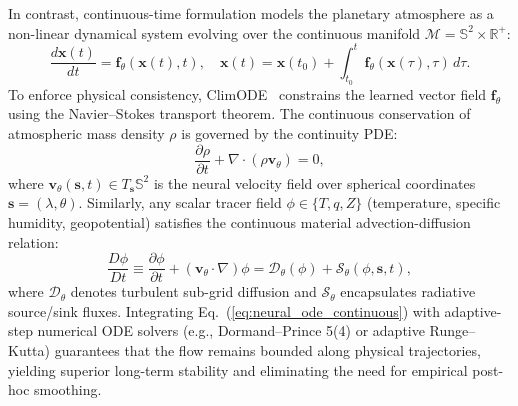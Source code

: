 In contrast, continuous-time formulation models the planetary atmosphere as a non-linear dynamical system evolving over the continuous manifold $\mathcal{M} = \mathbb{S}^2 \times \mathbb{R}^+$:
\begin{equation}
    \frac{d\mathbf{x}(t)}{dt} = \mathbf{f}_\theta(\mathbf{x}(t), t), \quad \mathbf{x}(t) = \mathbf{x}(t_0) + \int_{t_0}^t \mathbf{f}_\theta(\mathbf{x}(\tau), \tau)\, d\tau.
    \label{eq:neural_ode_continuous}
\end{equation}
To enforce physical consistency, ClimODE~\cite{verma2024climode} constrains the learned vector field $\mathbf{f}_\theta$ using the Navier--Stokes transport theorem. The continuous conservation of atmospheric mass density $\rho$ is governed by the continuity PDE:
\begin{equation}
    \frac{\partial \rho}{\partial t} + \nabla \cdot (\rho \mathbf{v}_\theta) = 0,
    \label{eq:continuity_pde}
\end{equation}
where $\mathbf{v}_\theta(\mathbf{s}, t) \in T_\mathbf{s}\mathbb{S}^2$ is the neural velocity field over spherical coordinates $\mathbf{s} = (\lambda, \theta)$. Similarly, any scalar tracer field $\phi \in \{T, q, Z\}$ (temperature, specific humidity, geopotential) satisfies the continuous material advection-diffusion relation:
\begin{equation}
    \frac{D\phi}{Dt} \equiv \frac{\partial \phi}{\partial t} + (\mathbf{v}_\theta \cdot \nabla)\phi = \mathcal{D}_\theta(\phi) + \mathcal{S}_\theta(\phi, \mathbf{s}, t),
    \label{eq:advection_pde}
\end{equation}
where $\mathcal{D}_\theta$ denotes turbulent sub-grid diffusion and $\mathcal{S}_\theta$ encapsulates radiative source/sink fluxes. Integrating Eq.~(\ref{eq:neural_ode_continuous}) with adaptive-step numerical ODE solvers (e.g., Dormand--Prince 5(4) or adaptive Runge--Kutta) guarantees that the flow remains bounded along physical trajectories, yielding superior long-term stability and eliminating the need for empirical post-hoc smoothing.

